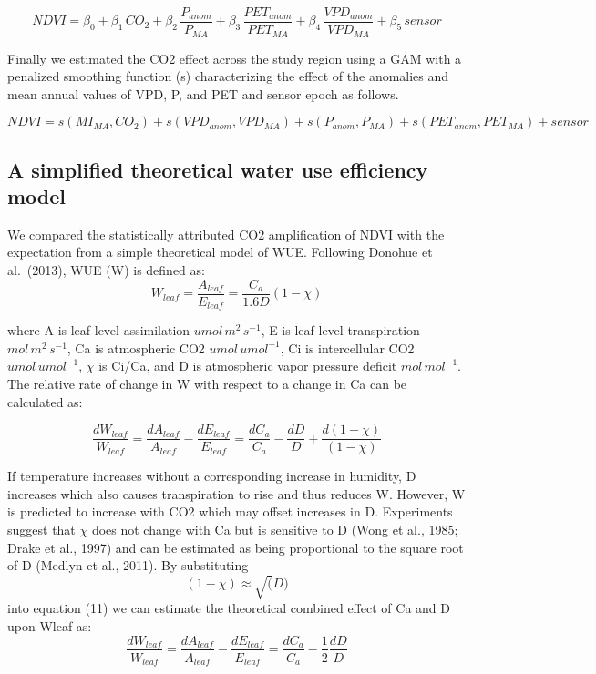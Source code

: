 \documentclass[gc, manuscript]{copernicus}
\begin{document}
\begin{equation}
NDVI=\beta_0+ \beta_1\,CO_2+\beta_2\,\frac{P_{anom}}{P_{MA}}+\beta_3\,\frac{PET_{anom}}{PET_{MA}}+\beta_4\,\frac{VPD_{anom}}{{VPD_{MA}}}+\beta_5\,sensor
\end{equation}

Finally we estimated the CO2 effect across the study region using a GAM
with a penalized smoothing function (s) characterizing the effect of the
anomalies and mean annual values of VPD, P, and PET and sensor epoch as
follows.

\begin{equation}
NDVI = s(MI_{MA},CO_2) + s(VPD_{anom},VPD_{MA})+s(P_{anom},P_{MA})+s(PET_{anom},PET_{MA})+sensor
\end{equation}

\subsection{A simplified theoretical water use efficiency model}

We compared the statistically attributed CO2 amplification of NDVI with
the expectation from a simple theoretical model of WUE. Following
Donohue et al.~(2013), WUE (W) is defined as: \begin{equation}
W_{leaf} = \frac{A_{leaf}}{E_{leaf}} = \frac{C_a}{1.6D}(1 - \chi)
\end{equation}

where A is leaf level assimilation \(umol\,m^{2}\,s^{-1}\), E is leaf
level transpiration \(mol\,m^{2}\,s^{-1}\), Ca is atmospheric CO2
\(umol\,umol^{-1}\), Ci is intercellular CO2 \(umol\,umol^{-1}\),
\(\chi\) is Ci/Ca, and D is atmospheric vapor pressure deficit
\(mol\,mol^{-1}\). The relative rate of change in W with respect to a
change in Ca can be calculated as:

\begin{equation}
\frac{dW_{leaf}}{W_{leaf}}=\frac{dA_{leaf}}{A_{leaf}} - \frac{dE_{leaf}}{E_{leaf}} = \frac{dC_a}{C_a} - \frac{dD}{D} + \frac{d(1-\chi)}{(1-\chi)}
\end{equation}

If temperature increases without a corresponding increase in humidity, D
increases which also causes transpiration to rise and thus reduces W.
However, W is predicted to increase with CO2 which may offset increases
in D. Experiments suggest that \(\chi\) does not change with Ca but is
sensitive to D (Wong et al., 1985; Drake et al., 1997) and can be
estimated as being proportional to the square root of D (Medlyn et al.,
2011). By substituting \[(1-\chi) \approx \sqrt(D)\] into equation (11)
we can estimate the theoretical combined effect of Ca and D upon Wleaf
as: \begin{equation}
\frac{dW_{leaf}}{W_{leaf}}=\frac{dA_{leaf}}{A_{leaf}} - \frac{dE_{leaf}}{E_{leaf}} = \frac{dC_a}{C_a} - \frac{1}{2}\frac{dD}{D}
\end{equation}
\end{document}

